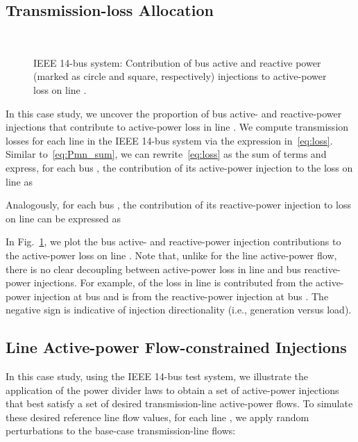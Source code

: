 \documentclass[journal]{IEEEtran}
\theoremstyle{definition}
\begin{document}
\subsection{Transmission-loss Allocation}

\begin{figure}[t!]
\centering
\mbox{
}
\caption{IEEE 14-bus system: Contribution of bus active and reactive power (marked as circle and square, respectively) injections to active-power loss on line .}
\label{fig:line7loss}
\vspace{-10pt}
\end{figure}

In this case study, we uncover the proportion of bus active- and reactive-power injections that contribute to active-power loss in line .  We compute transmission losses for each line  in the IEEE 14-bus system via the expression in~\eqref{eq:loss}.   Similar to~\eqref{eq:Pmn_sum}, we can rewrite~\eqref{eq:loss} as the sum of  terms and express, for each bus , the contribution of its active-power injection to the loss on line  as

Analogously, for each bus , the contribution of its reactive-power injection to loss on line  can be expressed as

In Fig.~\ref{fig:line7loss}, we plot the bus active- and reactive-power injection contributions to the active-power loss on line .  Note that, unlike for the line active-power flow, there is no clear decoupling between active-power loss in line  and bus reactive-power injections.  For example,  of the loss in line  is contributed from the active-power injection at bus  and  is from the reactive-power injection at bus .  The negative sign is indicative of injection directionality (i.e., generation versus load).

\subsection{Line Active-power Flow-constrained Injections} 
In this case study, using the IEEE 14-bus test system, we illustrate the application of the power divider laws to  obtain a set of active-power injections that best satisfy a set of desired transmission-line active-power flows.  To simulate these desired reference line flow values, for each line , we apply random perturbations to the base-case transmission-line flows:
\end{document}
